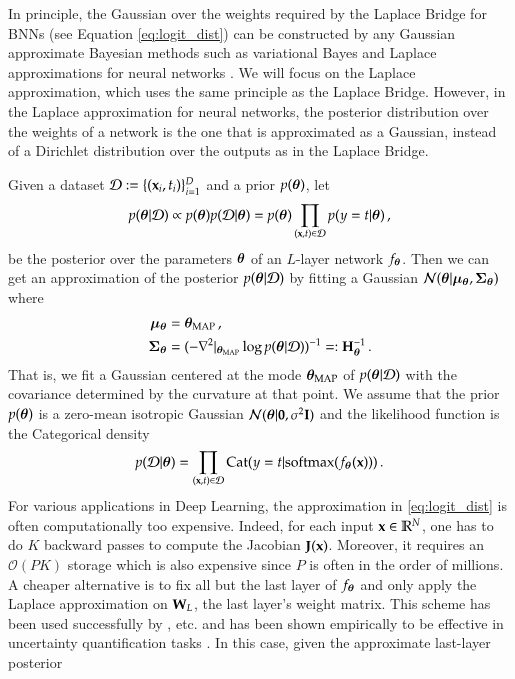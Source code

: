 
In principle, the Gaussian over the weights required by the Laplace Bridge for BNNs (see Equation \ref{eq:logit_dist}) can be constructed by any Gaussian approximate Bayesian methods such as variational Bayes \citep{Graves2011VB,Blundell2015WeightUI} and Laplace approximations for neural networks \citep{MacKay1992,ritter2018a}. We will focus on the Laplace approximation, which uses the same principle as the Laplace Bridge. However, in the Laplace approximation for neural networks, the posterior distribution over the weights of a network is the one that is approximated as a Gaussian, instead of a Dirichlet distribution over the outputs as in the Laplace Bridge.

Given a dataset $\mathcal{D} := \{ (\mathbf{x}_i, t_i) \}_{i=1}^D$ and a prior $p({\boldsymbol{\theta}})$, let
%
\begin{equation}
    p({\boldsymbol{\theta}} | \mathcal{D}) \propto p({\boldsymbol{\theta}}) p(\mathcal{D} | {\boldsymbol{\theta}}) = p({\boldsymbol{\theta}}) \prod_{(\mathbf{x}, t) \in \mathcal{D}} p(y = t | {\boldsymbol{\theta}}) \, ,
\end{equation}
%
be the posterior over the parameters ${\boldsymbol{\theta}}$ of an $L$-layer network $f_{\boldsymbol{\theta}}$. Then we can get an approximation of the posterior $p({\boldsymbol{\theta}} | \mathcal{D})$ by fitting a Gaussian $\mathcal{N}({\boldsymbol{\theta}} | {\boldsymbol{\mu}}_{\boldsymbol{\theta}}, {\boldsymbol{\Sigma}}_{\boldsymbol{\theta}})$ where
%
\begin{align*}
    {\boldsymbol{\mu}}_{\boldsymbol{\theta}} &= {\boldsymbol{\theta}}_\text{MAP} \, , \\
    {\boldsymbol{\Sigma}}_{\boldsymbol{\theta}} &= (-\nabla^2 \vert_{{\boldsymbol{\theta}}_\text{MAP}} \log p({\boldsymbol{\theta}} | \mathcal{D}))^{-1} =: {\mathbf{H}}_{\boldsymbol{\theta}}^{-1} \, .
\end{align*}
%
That is, we fit a Gaussian centered at the mode ${\boldsymbol{\theta}}_\text{MAP}$ of $p({\boldsymbol{\theta}} | \mathcal{D})$ with the covariance determined by the curvature at that point. We assume that the prior $p({\boldsymbol{\theta}})$ is a zero-mean isotropic Gaussian $\mathcal{N}({\boldsymbol{\theta}} | \mathbf{0}, \sigma^2 {\mathbf{I}})$ and the likelihood function is the Categorical density
%
\begin{equation*}
    p(\mathcal{D} | {\boldsymbol{\theta}}) = \prod_{(\mathbf{x}, t) \in \mathcal{D}} \mathrm{Cat}(y = t | \mathrm{softmax}(f_{\boldsymbol{\theta}}(\mathbf{x}))) \, .
\end{equation*}
%
For various applications in Deep Learning, the approximation in \eqref{eq:logit_dist} is often computationally too expensive. Indeed, for each input $\mathbf{x} \in \mathbb{R}^N$, one has to do $K$ backward passes to compute the Jacobian ${\mathbf{J}}(\mathbf{x})$. Moreover, it requires an $\mathcal{O}(PK)$ storage which is also expensive since $P$ is often in the order of millions. A cheaper alternative is to fix all but the last layer of $f_{\boldsymbol{\theta}}$ and only apply the Laplace approximation on ${\mathbf{W}}_L$, the last layer's weight matrix. This scheme has been used successfully by \citet{ScalableBayesianOptimizationDNNs2015,2016DeepKernelLearning}, etc. and has been shown empirically to be effective in uncertainty quantification tasks \citep{brosse2020last}. In this case, given the approximate last-layer posterior
